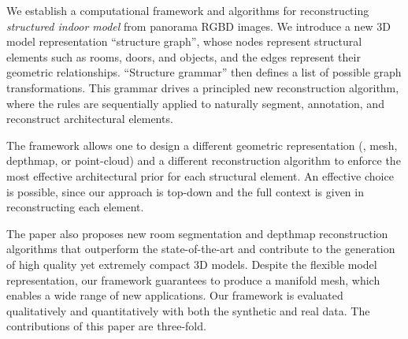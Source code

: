 We establish a computational framework and algorithms for reconstructing
{\it structured indoor model} from panorama RGBD images.
We introduce a new 3D model representation ``structure graph'', whose
nodes represent structural elements such as rooms, doors, and objects,
and the edges represent their geometric relationships. ``Structure
grammar'' then defines a list of possible graph transformations. This
grammar drives a principled new reconstruction algorithm, where the
rules are sequentially applied to naturally segment, annotation, and
reconstruct architectural elements.


The framework allows one to design a different geometric representation
(\eg, mesh, depthmap, or point-cloud) and a different reconstruction
algorithm to enforce the most effective architectural prior for each
structural element. An effective choice is possible, since our approach
is top-down and the full context is given in reconstructing each
element. 


The paper also proposes new room segmentation and depthmap
reconstruction algorithms that outperform the state-of-the-art and
contribute to the generation of high quality yet extremely compact
3D models.
%
Despite the flexible model representation, our framework guarantees to
produce a manifold mesh, which enables a wide range of new
applications. Our framework is evaluated qualitatively and
quantitatively with both the synthetic and real data.
The contributions of this paper are three-fold.
 
